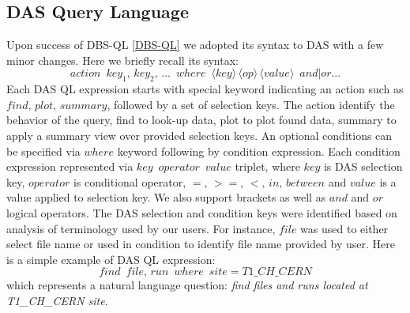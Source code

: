 \documentclass[a4paper]{jpconf}
\begin{document}
\subsection{DAS Query Language}
Upon success of DBS-QL \ref{DBS-QL} we adopted its syntax to DAS with a few minor
changes. Here we briefly recall its syntax:
\begin{equation}
action\,\,\,
key_1,\, key_2,\, ...\,\,\, where\,\,\,
\langle key\rangle\, 
\langle op\rangle\, 
\langle value\rangle \,\,\, and|or ...
\label{QL_syntax}
\end{equation}
Each DAS QL expression starts with special keyword indicating an action such as 
$find,\, plot,\, summary$, followed by a set of selection keys. The action identify
the behavior of the query, find to look-up data, plot to plot found data, summary to
apply a summary view over provided selection keys. An optional conditions can be 
specified via $where$ keyword following by condition expression.
Each condition expression represented via $key\,\,\, operator\,\,\, value$ triplet, where
$key$ is DAS selection key, $operator$ is conditional operator, 
$=,\, >=,\, <,\, in,\, between$ and $value$ is a value applied to selection key.
We also support brackets as well as $and$ and $or$ logical operators.
The DAS selection and condition keys were identified based on analysis 
of terminology used by our users. For instance, $file$ was used to either
select file name or used in condition to identify file name provided by user.
Here is a simple example of DAS QL expression:
$$
find\,\,\, file,\, run\,\,\, where\,\,\, site=T1\_CH\_CERN
$$
which represents a natural language question: 
{\it find files and runs located at T1\_CH\_CERN site}.
\end{document}
